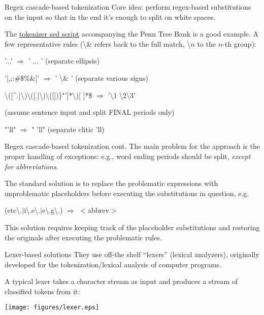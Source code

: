\documentclass[style=upen, size=14pt]{powerdot}
\theoremstyle{definition}
\begin{document}
\begin{slide}[toc=Regex cascade]{Regex cascade-based tokenization}
  Core idea: perform regex-based substitutions on the input so that in the end
  it's enough to split on white spaces.\bigskip

  The
  \href{ftp://ftp.cis.upenn.edu/pub/treebank/public_html/tokenizer.sed}{tokenizer
    sed script} accompanying the Penn Tree Bank is a good example. A few
  representative rules (\textbackslash \& refers back to the full match,
  \textbackslash $n$ to the $n$-th group):\bigskip

  '...' $\Rightarrow$ ' ... ' (separate ellipsis)
  
  '[,;:\#\$\%\&]' $\Rightarrow$ ' \textbackslash \& ' (separate various signs)

  
  \textbackslash([\^{}.]\textbackslash)\textbackslash([.]\textbackslash)\textbackslash([])\}"']*\textbackslash)[   ]*\$ $\Rightarrow$ '\textbackslash 1 \textbackslash 2\textbackslash 3'

  (assume sentence input and split FINAL periods only)

  "'ll" $\Rightarrow$ " 'll" (separate clitic 'll)
\end{slide}

\begin{slide}[toc=]{Regex cascade-based tokenization cont.}
  The main problem for the approach is the proper handling of exceptions: e.g.,
  word ending periods should be split, \emph{except for abbreviations}.\bigskip

  The standard solution is to replace the problematic expressions with
  unproblematic placeholders before executing the substitutions in question, e.g.\smallskip

  \begin{center}
    (etc\textbackslash.$\vert$i\textbackslash.e\textbackslash.$\vert$e\textbackslash.g\textbackslash.)
    $\Rightarrow$ $<$abbrev$>$
  \end{center}\smallskip
  
  This solution requires keeping track of the placeholder substitutions and
  restoring the originals after executing the problematic rules.
\end{slide}

\begin{slide}[toc=Lexers]{Lexer-based solutions}
  They use off-the shelf ``lexers'' (lexical analyzers), originally developed
  for the tokenization/lexical analysis of computer programs.

  A typical lexer takes a character stream as input and produces a stream of
  classified tokens from it:

  \begin{center}
    \texttt{[image: figures/lexer.eps]}
  \end{center}
\end{slide}
\end{document}
